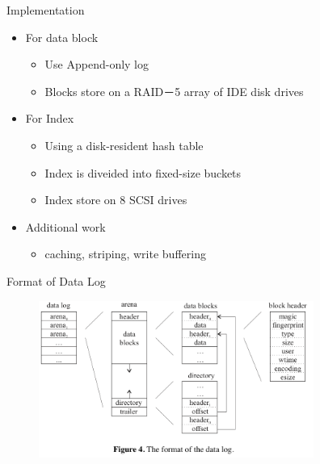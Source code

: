 \begin{frame}{Implementation}

\begin{itemize}
\itemsep1pt\parskip0pt
\item
  For data block

  \begin{itemize}
  \itemsep1pt\parskip0pt
  \item
    Use Append-only log
  \item
    Blocks store on a RAID－5 array of IDE disk drives
  \end{itemize}
\item
  For Index

  \begin{itemize}
  \itemsep1pt\parskip0pt
  \item
    Using a disk-resident hash table
  \item
    Index is diveided into fixed-size buckets
  \item
    Index store on 8 SCSI drives
  \end{itemize}
\item
  Additional work

  \begin{itemize}
  \itemsep1pt\parskip0pt
  \item
    caching, striping, write buffering
  \end{itemize}
\end{itemize}

\end{frame}

\begin{frame}{Format of Data Log}

\begin{figure}
\includegraphics[width = 9cm]{pic4.png}
\end{figure}

\end{frame}


